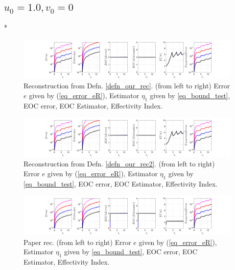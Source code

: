 \documentclass[12pt,a4paper]{article}
\numberwithin{equation}{section}
\theoremstyle{definition}
\begin{document}
\subsection*{$u_0=1.0, v_0= 0$}
\/*
\begin{figure}[H]
	\hspace{-3cm}
	\includegraphics[scale=0.55]{fig_LeapFrogplots_1x5_sin_IC_harmonic_order_2_u10_v0_rec_george}	
	\caption{Reconstruction from Defn. \ref{defn_our_rec}. (from left to right) Error $e$ given by (\ref{eq_error_eR}), Estimator $\eta_1$ given by \ref{eq_bound_test},  EOC error, EOC Estimator, Effectivity Index.}
	\label{fig_all_in_one_our_rec_george_u10_v0}
\end{figure}
\begin{figure}[H]
	\hspace{-3cm}
	\includegraphics[scale=0.55]{fig_LeapFrogplots_1x5_sin_IC_harmonic_order_2_u10_v0_rec2}	
	\caption{Reconstruction from Defn. \ref{defn_our_rec2}. (from left to right) Error $e$ given by (\ref{eq_error_eR}), Estimator $\eta_1$ given by \ref{eq_bound_test},   EOC error, EOC Estimator, Effectivity Index.}
	\label{fig_all_in_one_our_rec_2_u10_v0}
\end{figure}
\begin{figure}[H]
	\hspace{-3cm}
	\includegraphics[scale=0.55]{fig_LeapFrogplots_1x5_sin_IC_harmonic_u10_v0_paperrec}	
	\caption{Paper rec. (from left to right) Error $e$ given by (\ref{eq_error_eR}), Estimator $\eta_1$ given by \ref{eq_bound_test}, EOC error, EOC Estimator, Effectivity Index.}
	\label{fig_all_in_one_paperrec_u10_v1}
\end{figure}
\end{document}
